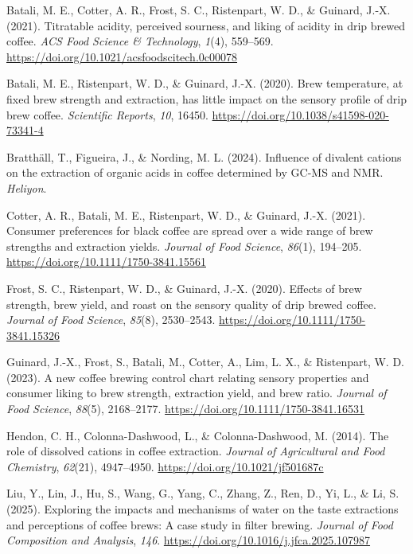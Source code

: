 \documentclass[
  a4paper,
]{article}
\newlength{\cslhangindent}
\newenvironment{CSLReferences}[2] %
 {\begin{list}{}{%
  \setlength{\itemindent}{0pt}
  \setlength{\leftmargin}{0pt}
  \setlength{\parsep}{0pt}
  \ifodd #1
   \setlength{\leftmargin}{\cslhangindent}
   \setlength{\itemindent}{-1\cslhangindent}
  \fi
  \setlength{\itemsep}{#2\baselineskip}}}
 {\end{list}}
\begin{document}
\protect{}\label{refs}
\begin{CSLReferences}{1}{0}
Batali, M. E., Cotter, A. R., Frost, S. C., Ristenpart, W. D., \&
Guinard, J.-X. (2021). Titratable acidity, perceived sourness, and
liking of acidity in drip brewed coffee. \emph{ACS Food Science \&
Technology}, \emph{1}(4), 559--569.
\url{https://doi.org/10.1021/acsfoodscitech.0c00078}

Batali, M. E., Ristenpart, W. D., \& Guinard, J.-X. (2020). Brew
temperature, at fixed brew strength and extraction, has little impact on
the sensory profile of drip brew coffee. \emph{Scientific Reports},
\emph{10}, 16450. \url{https://doi.org/10.1038/s41598-020-73341-4}

Bratthäll, T., Figueira, J., \& Nording, M. L. (2024). Influence of
divalent cations on the extraction of organic acids in coffee determined
by GC-MS and NMR. \emph{Heliyon}.

Cotter, A. R., Batali, M. E., Ristenpart, W. D., \& Guinard, J.-X.
(2021). Consumer preferences for black coffee are spread over a wide
range of brew strengths and extraction yields. \emph{Journal of Food
Science}, \emph{86}(1), 194--205.
\url{https://doi.org/10.1111/1750-3841.15561}

Frost, S. C., Ristenpart, W. D., \& Guinard, J.-X. (2020). Effects of
brew strength, brew yield, and roast on the sensory quality of drip
brewed coffee. \emph{Journal of Food Science}, \emph{85}(8), 2530--2543.
\url{https://doi.org/10.1111/1750-3841.15326}

Guinard, J.-X., Frost, S., Batali, M., Cotter, A., Lim, L. X., \&
Ristenpart, W. D. (2023). A new coffee brewing control chart relating
sensory properties and consumer liking to brew strength, extraction
yield, and brew ratio. \emph{Journal of Food Science}, \emph{88}(5),
2168--2177. \url{https://doi.org/10.1111/1750-3841.16531}

Hendon, C. H., Colonna-Dashwood, L., \& Colonna-Dashwood, M. (2014). The
role of dissolved cations in coffee extraction. \emph{Journal of
Agricultural and Food Chemistry}, \emph{62}(21), 4947--4950.
\url{https://doi.org/10.1021/jf501687c}

Liu, Y., Lin, J., Hu, S., Wang, G., Yang, C., Zhang, Z., Ren, D., Yi,
L., \& Li, S. (2025). Exploring the impacts and mechanisms of water on
the taste extractions and perceptions of coffee brews: A case study in
filter brewing. \emph{Journal of Food Composition and Analysis},
\emph{146}. \url{https://doi.org/10.1016/j.jfca.2025.107987}


\end{CSLReferences}
\end{document}

